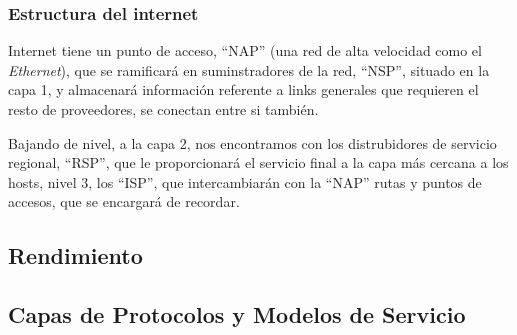 \subsubsection{Estructura del internet}
\noindent Internet tiene un punto de acceso, ``NAP'' (una red de alta velocidad como el \textit{Ethernet}), que se ramificará en suminstradores de la red, ``NSP'', situado en la capa 1, y almacenará información referente a links generales que requieren el resto de proveedores, se conectan entre si también.\par Bajando de nivel, a la capa 2, nos encontramos con los distrubidores de servicio regional, ``RSP'', que le proporcionará el servicio final a la capa más cercana a los hosts, nivel 3, los ``ISP'', que intercambiarán con la ``NAP'' rutas y puntos de accesos, que se encargará de recordar.
\subsection{Rendimiento}
\subsection{Capas de Protocolos y Modelos de Servicio}
